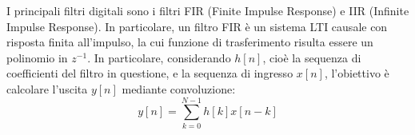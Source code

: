 I principali filtri digitali sono i filtri FIR (Finite Impulse Response) e IIR (Infinite Impulse Response). In particolare, un filtro FIR è un sistema LTI causale con risposta finita all'impulso, la cui funzione di trasferimento risulta essere un polinomio in $z^{-1}$. 
In particolare, considerando $h[n]$, cioè la sequenza di coefficienti del filtro in questione, e la sequenza di ingresso $x[n]$, l'obiettivo è calcolare l'uscita $y[n]$ mediante convoluzione:
\begin{equation}
    y[n] = \sum_{k=0}^{N-1} h[k] x[n-k]
\end{equation}